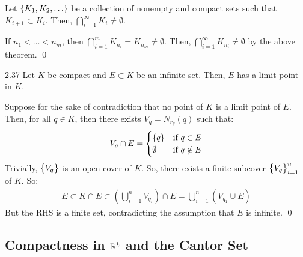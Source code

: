 \begin{ncorollary}{}{}
    Let $\set{K_1, K_2, \ldots}$ be a collection of nonempty and compact sets such that $K_{i+1} \subset K_i$. Then, $\bigcap_{i=1}^\infty K_i \neq \emptyset$.
\end{ncorollary}
\begin{nproof}
    If $n_1 < \ldots < n_m$, then $\bigcap_{i=1}^m K_{n_i} = K_{n_m} \neq \emptyset$. Then, $\bigcap_{i=1}^\infty K_{n_i} \neq \emptyset$ by the above theorem. \qed
\end{nproof}

\begin{theorem}{}{2.37}
    Let $K$ be compact and $E \subset K$ be an infinite set. Then, $E$ has a limit point in $K$.
\end{theorem}
\begin{nproof}
    Suppose for the sake of contradiction that no point of $K$ is a limit point of $E$. Then, for all $q \in K$, then there exists $V_q = N_{r_q}(q)$ such that:
    \begin{align*}
        V_q \cap E = \begin{cases}
            \set{q} & \text{if $q \in E$}
            \\ \emptyset & \text{if $q \notin E$}
        \end{cases}
    \end{align*}
    Trivially, $\set{V_q}$ is an open cover of $K$. So, there exists a finite subcover $\set{V_q}_{i=1}^n$ of $K$. So:
    \begin{align*}
        E \subset K \cap E \subset \left(\bigcup_{i=1}^n V_{q_i}\right) \cap E = \bigcup_{i=1}^n(V_{q_1} \cup E)
    \end{align*}
    But the RHS is a finite set, contradicting the assumption that $E$ is infinite. \qed
\end{nproof}

\subsection{Compactness in \texorpdfstring{$\mathbb{R}^k$}{Rk} and the Cantor Set}

